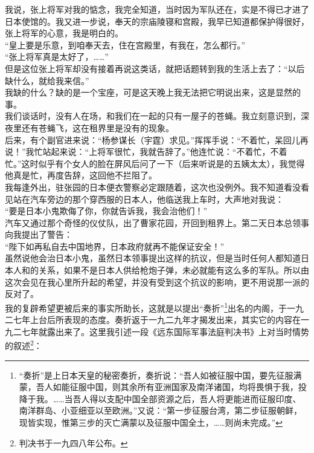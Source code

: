 我说，张上将军对我的惦念，我完全知道，当时因为军队还在，实是不得已才进了日本使馆的。我又进一步说，奉天的宗庙陵寝和宫殿，我早已知道都保护得很好，张上将军的心意，我是明白的。\\

“皇上要是乐意，到咱奉天去，住在宫殿里，有我在，怎么都行。”\\

“张上将军真是太好了，……”\\

但是这位张上将军却没有接着再说这类话，就把话题转到我的生活上去了：“以后缺什么，就给我来信。”\\

我缺的什么？缺的是一个宝座，可是这天晚上我无法把它明说出来，这是显然的事。\\

我们谈话时，没有人在场，和我们在一起的只有一屋子的苍蝇。我立刻意识到，深夜里还有苍蝇飞，这在租界里是没有的现象。\\

后来，有个副官进来说：“杨参谋长（宇霆）求见。”挥挥手说：“不着忙，呆回儿再说！”我忙站起来说：“上将军很忙，我就告辞了。”他连忙说：“不着忙，不着忙。”这时似乎有个女人的脸在屏风后问了一下（后来听说是的五姨太太），我觉得他真是忙，再度告辞，这回他不拦阻了。\\

我每逢外出，驻张园的日本便衣警察必定跟随着，这次也没例外。我不知道看没看见站在汽车旁边的那个穿西服的日本人，他临送我上车时，大声地对我说：\\

“要是日本小鬼欺侮了你，你就告诉我，我会治他们！”\\

汽车又通过那个奇怪的仪仗队，出了曹家花园，开回到租界上。第二天日本总领事向我提出了警告：\\

“陛下如再私自去中国地界，日本政府就再不能保证安全！”\\

虽然说他会治日本小鬼，虽然日本领事提出这样的抗议，但是当时任何人都知道日本人和的关系，如果不是日本人供给枪炮子弹，未必就能有这么多的军队。所以由这次会见在我心里所升起的希望，并没有受到这个抗议的影响，更不用说那一派的反对了。\\

我的复辟希望更被后来的事实所助长，这就是以提出“奏折”\footnote{“奏折”是上日本天皇的秘密奏折，奏折说：“吾人如被征服中国，要先征服满蒙，吾人如能征服中国，则其余所有亚洲国家及南洋诸国，均将畏惧于我，投降于我。……当吾人得以支配中国全部资源之后，吾人将更能进而征服印度、南洋群岛、小亚细亚以至欧洲。”又说：“第一步征服台湾，第二步征服朝鲜，现皆实现，惟第三步的灭亡满蒙以及征服中国全土，……则尚未完成。”}出名的内阁，于一九二七年上台后所表现的态度。奏折返于一九二九年才揭发出来，其实它的内容在一九二七年就露出来了。这里我引述一段《远东国际军事法庭判决书》上对当时情势的叙述\footnote{判决书于一九四八年公布。}：\\

